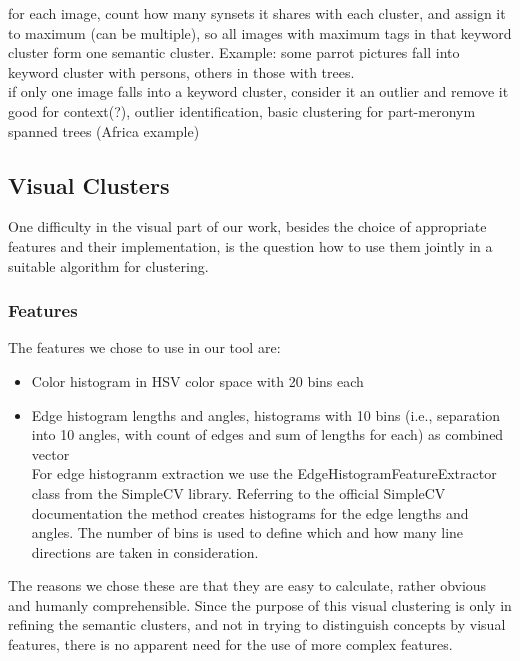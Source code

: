 \bigskip
for each image, count how many synsets it shares with each cluster, and assign it to maximum (can be multiple), so all images with maximum tags in that keyword cluster form one semantic cluster. Example: some parrot pictures fall into keyword cluster with persons, others in those with trees. \\
if only one image falls into a keyword cluster, consider it an outlier and remove it
good for context(?), outlier identification, basic clustering for part-meronym spanned trees (Africa example)

\subsection{Visual Clusters}
\label{sec_visualclustering}

One difficulty in the visual part of our work, besides the choice of appropriate features and their implementation, is the question how to use them jointly in a suitable algorithm for clustering.

\subsubsection{Features}
The features we chose to use in our tool are:
\begin{itemize}
\item{Color histogram} in HSV color space with 20 bins each
\item{Edge histogram} lengths and angles, histograms with 10 bins (i.e., separation into 10 angles, with count of edges and sum of lengths for each) as combined vector 
\\
For edge histogranm extraction we use the EdgeHistogramFeatureExtractor class from the SimpleCV library. Referring to the official SimpleCV documentation   the method creates histograms for the edge lengths and angles. The number of bins is used to define which and how many line directions are taken in consideration.
\end{itemize}
The reasons we chose these are that they are easy to calculate, rather obvious and humanly comprehensible. Since the purpose of this visual clustering is only in refining the semantic clusters, and not in trying to distinguish concepts by visual features, there is no apparent need for the use of more complex features. \\


